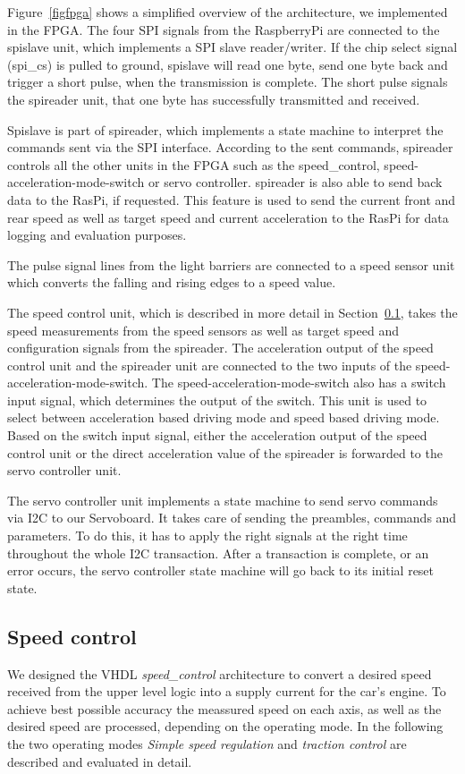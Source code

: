 \documentclass[a4paper
               ,10pt
               ,DIV=10 %
               ,BCOR=0.3cm
               ,pagesize %
               ,headings=small
               ,bibtotoc
               ]
               {scrartcl}
\begin{document}
Figure~\ref{figfpga} shows a simplified overview of the architecture, we implemented in the FPGA.
The four SPI signals from the RaspberryPi are connected to the spislave unit, which implements a SPI slave reader/writer.
If the chip select signal (spi\_cs) is pulled to ground, spislave will read one byte, send one byte back and trigger a short pulse, when the transmission is complete.
The short pulse signals the spireader unit, that one byte has successfully transmitted and received.


Spislave is part of spireader, which implements a state machine to interpret the commands sent via the SPI interface.
According to the sent commands, spireader controls all the other units in the FPGA such as the speed\_control, speed-acceleration-mode-switch or servo controller.
spireader is also able to send back data to the RasPi, if requested. This feature is used to send the current front and rear speed as well as target speed and current acceleration to the RasPi for data logging and evaluation purposes.

The pulse signal lines from the light barriers are connected to a speed sensor unit which converts the falling and rising edges to a speed value.

The speed control unit, which is described in more detail in Section~\ref{speed}, takes the speed measurements from the speed sensors as well as target speed and configuration signals from the spireader.
The acceleration output of the speed control unit and the spireader unit are connected to the two inputs of the speed-acceleration-mode-switch.
The speed-acceleration-mode-switch also has a switch input signal, which determines the output of the switch. This unit is used to select between acceleration based driving mode and speed based driving mode. Based on the switch input signal, either the acceleration output of the speed control unit or the direct acceleration value of the spireader is forwarded to the servo controller unit.

The servo controller unit implements a state machine to send servo commands via I2C to our Servoboard.
It takes care of sending the preambles, commands and parameters.
To do this, it has to apply the right signals at the right time throughout the whole I2C transaction.
After a transaction is complete, or an error occurs, the servo controller state machine will go back to its initial reset state.



\subsection{Speed control} \label{speed}
We designed the VHDL \emph{speed\_control} architecture to convert a desired speed received from the upper level logic into a supply current for the car's engine. To achieve best possible accuracy the meassured speed on each axis, as well as the desired speed are processed, depending on the operating mode. In the following the two operating modes \emph{Simple speed regulation} and \emph{traction control} are described and evaluated in detail.
\end{document}
